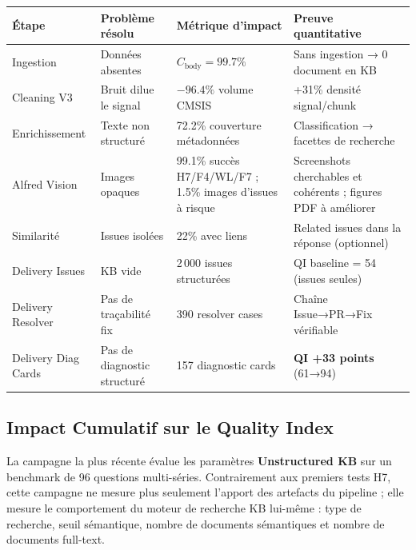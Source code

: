 \documentclass[12pt,a4paper]{report}
\begin{document}
\begin{longtable}{p{2.5cm}p{3cm}p{3.5cm}p{4cm}}
\toprule
\textbf{Étape} & \textbf{Problème résolu} & \textbf{Métrique d'impact} & \textbf{Preuve quantitative} \\
\midrule
Ingestion & Données absentes & $C_{\text{body}} = 99.7\%$ & Sans ingestion → 0 document en KB \\
Cleaning V3 & Bruit dilue le signal & $-96.4\%$ volume CMSIS & +31\% densité signal/chunk \\
Enrichissement & Texte non structuré & 72.2\% couverture métadonnées & Classification → facettes de recherche \\
Alfred Vision & Images opaques & 99.1\% succès H7/F4/WL/F7 ; 1.5\% images d'issues à risque & Screenshots cherchables et cohérents ; figures PDF à améliorer \\
Similarité & Issues isolées & 22\% avec liens & Related issues dans la réponse (optionnel) \\
Delivery Issues & KB vide & 2\,000 issues structurées & QI baseline = 54 (issues seules) \\
Delivery Resolver & Pas de traçabilité fix & 390 resolver cases & Chaîne Issue→PR→Fix vérifiable \\
Delivery Diag Cards & Pas de diagnostic structuré & 157 diagnostic cards & \textbf{QI +33 points} (61→94) \\
\bottomrule
\end{longtable}

\subsection{Impact Cumulatif sur le Quality Index}

La campagne la plus récente évalue les paramètres \textbf{Unstructured KB} sur un benchmark de 96 questions multi-séries. Contrairement aux premiers tests H7, cette campagne ne mesure plus seulement l'apport des artefacts du pipeline ; elle mesure le comportement du moteur de recherche KB lui-même : type de recherche, seuil sémantique, nombre de documents sémantiques et nombre de documents full-text.
\end{document}
